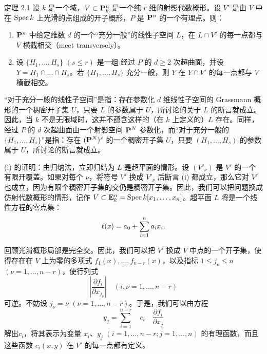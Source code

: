 \begin{enonce*}{定理 2.1} %
设 $k$ 是一个域，$V\subset \mathbf{P}^n_k$ 是一个纯 $r$ 维的射影代数概形。设 $V'$ 是由 $V$ 中在 $\operatorname{Spec} k$ 上光滑的点组成的开子概形，$P$ 是 $\mathbf{P}^n$ 的一个有理点。则：
\begin{enumerate}
\renewcommand{\theenumi}{\roman{enumi}}
\renewcommand{\labelenumi}{(\theenumi)}
\item $\mathbf{P}^n$ 中给定维数 $d$ 的一个“充分一般”的线性子空间 $L$，在 $L\cap V'$ 的每一点都与 $V$ 横截相交（meet transversely）。

\item 设 $\{H_1,\ldots,H_s\}$ $(s\leq r)$ 是一组 %
  经过 $P$ 的 $d\geq 2$ 次超曲面，并设 $Y=H_1\cap\ldots \cap H_s$。若 $\{H_1,\ldots,H_s\}$ 充分一般，则 $Y$ 在 $Y\cap V'$ 的每一点都与 $V$ 横截相交。
\end{enumerate}
\end{enonce*}

“对于充分一般的线性子空间”是指：存在参数化 $d$ 维线性子空间的 Grassmann 概形的一个稠密开子集 $U$，只要 $L$ 的参数属于 $U$，所讨论的关于 $L$ 的断言就成立。因此，当 $k$ 不是无限域时，这并不蕴含这样的（在 $k$ 上定义的）$L$ 存在。同样，
经过 $P$ 的 $d$ 次超曲面由一个射影空间 $\mathbf{P}^N$ \pageoriginale 参数化，而“对于充分一般的 $\{H_1,\ldots,H_s\}$”是指：存在 $(\mathbf{P}^N)^s$ 的一个稠密开子集 $U$，只要 $(H_1,\ldots,H_s)$ 的参数属于 $U$，所讨论的断言就成立。

(i) 的证明：由归纳法，立即归结为 $L$ 是超平面的情形。设 $(V'_{\nu})$ 是 $V'$ 的一个有限开覆盖。如果对每个 $\nu$，将符号 $V'$ 换成 $V'_{\nu}$ 后断言 (i) 都成立，那么它对 $V'$ 也成立，因为有限个稠密开子集的交仍是稠密开子集。因此，我们可以把问题换成仿射代数概形的情形，记作 $V\subset \mathbf{E}^n_k=\operatorname{Spec} k[x_1,\dots,x_n]$。超平面 $L$ 将是一个线性方程的零点集：
$$
\ell(x)=a_0+\sum^n_{i=1}a_ix_i{}.
$$

回顾光滑概形局部是完全交。因此，我们可以把 $V'$ 换成 $V$ 中点的一个开子集，使得存在在 $V$ 上为零的多项式 $f_1(x),\ldots,f_{n-r}(x)$，以及指标 $1\leq j_{\nu}\leq n$ $(\nu=1,\ldots,n-r)$，使行列式
$$
\left|\frac{\partial f_i}{\partial x_{j_{\nu}}}\right|\quad 
(i,\nu=1,\ldots,n-r)
$$
可逆。不妨设 $j_{\nu}=\nu$ $(\nu=1,\ldots,n-r)$。于是，我们可以由方程
$$
y_j=\sum^{n-r}_{i=1}\quad c_i\quad \frac{\partial f_i}{\partial x_j}
$$
解出\pageoriginale $c_i$，将其表示为变量 $x_i$、$y_j$ $(i=1,\ldots, n-r; j=1,\ldots,n)$ 的有理函数，而且这些函数 $c_i(x,y)$ 在 $V'$ 的每一点都有定义。

